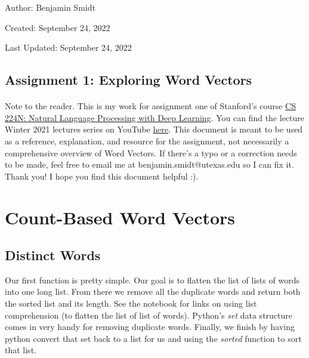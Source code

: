 \documentclass[12pt]{article}
\begin{document}
\noindent Author: Benjamin Smidt

\noindent Created: September 24, 2022

\noindent Last Updated: September 24, 2022
\begin{center}
\section*{Assignment 1: Exploring Word Vectors}
\end{center}

\paragraph{} Note to the reader. This is my work for assignment one of Stanford's course
\href{https://web.stanford.edu/class/cs224n/}{CS 224N: Natural Language Processing with Deep Learning}. 
You can find the lecture Winter 2021 lectures series on YouTube \href{https://www.youtube.com/playlist?list=PLoROMvodv4rOSH4v6133s9LFPRHjEmbmJ}{here}.
This document is meant to be used as a reference, explanation, and resource for the assignment, 
not necessarily a comprehensive overview of Word Vectors. If there's a typo or a correction 
needs to be made, feel free to email me at benjamin.smidt@utexas.edu so I can fix it. 
Thank you! I hope you find this document helpful :). 

\tableofcontents

\newpage

\section{Count-Based Word Vectors}

\subsection{Distinct Words}
Our first function is pretty simple. Our goal is to flatten the list of lists of words into one long list. 
From there we remove all the duplicate words and return both the sorted list and its length. See the
notebook for links on using list comprehension (to flatten the list of list of words). Python's \emph{set}
data structure comes in very handy for removing duplicate words. Finally, we finish by having python 
convert that set back to a list for us and using the \emph{sorted} function to sort that list. 
\end{document}
